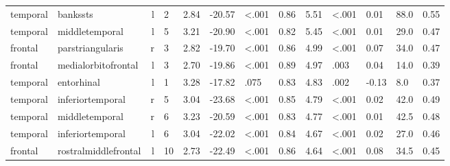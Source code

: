 \documentclass{article}
\begin{document}
\begin{longtable}{llrR{1.5cm}R{1cm}R{1.3cm}R{1cm}R{1cm}R{1.3cm}R{1cm}R{1.8cm}R{1.3cm}R{1.8cm}}
  temporal &                  bankssts &    l &            2 &                  2.84 &           -20.57 &      \textless.001 &                               0.86 &                          5.51 &                   \textless.001 &  0.01 &   88.0 &      0.55 \\
  temporal &            middletemporal &    l &            5 &                  3.21 &           -20.90 &      \textless.001 &                               0.82 &                          5.45 &                   \textless.001 &  0.01 &   29.0 &      0.47 \\
   frontal &          parstriangularis &    r &            3 &                  2.82 &           -19.70 &      \textless.001 &                               0.86 &                          4.99 &                   \textless.001 &  0.07 &   34.0 &      0.47 \\
   frontal &       medialorbitofrontal &    l &            3 &                  2.70 &           -19.86 &      \textless.001 &                               0.89 &                          4.97 &                            .003 &  0.04 &   14.0 &      0.39 \\
  temporal &                entorhinal &    l &            1 &                  3.28 &           -17.82 &               .075 &                               0.83 &                          4.83 &                            .002 & -0.13 &    8.0 &      0.37 \\
  temporal &          inferiortemporal &    r &            5 &                  3.04 &           -23.68 &      \textless.001 &                               0.85 &                          4.79 &                   \textless.001 &  0.02 &   42.0 &      0.49 \\
  temporal &            middletemporal &    r &            6 &                  3.23 &           -20.59 &      \textless.001 &                               0.83 &                          4.77 &                   \textless.001 &  0.01 &   42.5 &      0.48 \\
  temporal &          inferiortemporal &    l &            6 &                  3.04 &           -22.02 &      \textless.001 &                               0.84 &                          4.67 &                   \textless.001 &  0.02 &   27.0 &      0.46 \\
   frontal &      rostralmiddlefrontal &    l &           10 &                  2.73 &           -22.49 &      \textless.001 &                               0.86 &                          4.64 &                   \textless.001 &  0.08 &   34.5 &      0.45 \\

\end{longtable}
\end{document}
